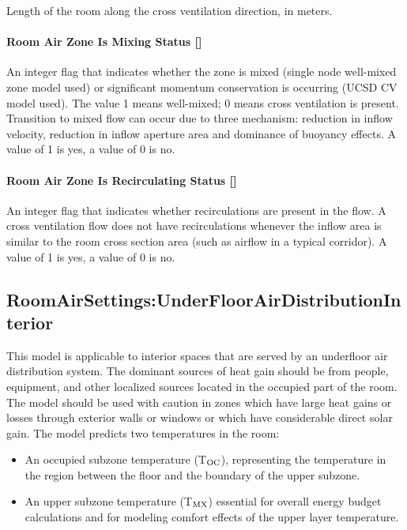 Length of the room along the cross ventilation direction, in meters.

\paragraph{Room Air Zone Is Mixing Status {[]}}\label{room-air-zone-is-mixing-status}

An integer flag that indicates whether the zone is mixed (single node well-mixed zone model used) or significant momentum conservation is occurring (UCSD CV model used). The value 1 means well-mixed; 0 means cross ventilation is present. Transition to mixed flow can occur due to three mechanism: reduction in inflow velocity, reduction in inflow aperture area and dominance of buoyancy effects. A value of 1 is yes, a value of 0 is no.

\paragraph{Room Air Zone Is Recirculating Status {[]}}\label{room-air-zone-is-recirculating-status}

An integer flag that indicates whether recirculations are present in the flow. A cross ventilation flow does not have recirculations whenever the inflow area is similar to the room cross section area (such as airflow in a typical corridor). A value of 1 is yes, a value of 0 is no.

\subsection{RoomAirSettings:UnderFloorAirDistributionInterior}\label{roomairsettingsunderfloorairdistributioninterior}

This model is applicable to interior spaces that are served by an underfloor air distribution system. The dominant sources of heat gain should be from people, equipment, and other localized sources located in the occupied part of the room. The model should be used with caution in zones which have large heat gains or losses through exterior walls or windows or which have considerable direct solar gain. The model predicts two temperatures in the room:

\begin{itemize}
\item
  An occupied subzone temperature (T\(_{\rm{OC}}\)), representing the temperature in the region between the floor and the boundary of the upper subzone.
\item
  An upper subzone temperature (T\(_{\rm{MX}}\)) essential for overall energy budget calculations and for modeling comfort effects of the upper layer temperature.
\end{itemize}

